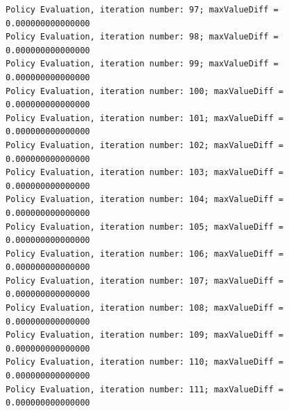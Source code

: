 \documentclass{article}
\begin{document}
\begin{scriptsize}
\begin{verbatim}
Policy Evaluation, iteration number: 97; maxValueDiff = 0.000000000000000 
Policy Evaluation, iteration number: 98; maxValueDiff = 0.000000000000000 
Policy Evaluation, iteration number: 99; maxValueDiff = 0.000000000000000 
Policy Evaluation, iteration number: 100; maxValueDiff = 0.000000000000000 
Policy Evaluation, iteration number: 101; maxValueDiff = 0.000000000000000 
Policy Evaluation, iteration number: 102; maxValueDiff = 0.000000000000000 
Policy Evaluation, iteration number: 103; maxValueDiff = 0.000000000000000 
Policy Evaluation, iteration number: 104; maxValueDiff = 0.000000000000000 
Policy Evaluation, iteration number: 105; maxValueDiff = 0.000000000000000 
Policy Evaluation, iteration number: 106; maxValueDiff = 0.000000000000000 
Policy Evaluation, iteration number: 107; maxValueDiff = 0.000000000000000 
Policy Evaluation, iteration number: 108; maxValueDiff = 0.000000000000000 
Policy Evaluation, iteration number: 109; maxValueDiff = 0.000000000000000 
Policy Evaluation, iteration number: 110; maxValueDiff = 0.000000000000000 
Policy Evaluation, iteration number: 111; maxValueDiff = 0.000000000000000
\end{verbatim}
\end{scriptsize}
\clearpage
\end{document}
